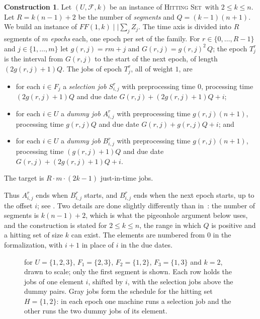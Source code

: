 \documentclass[11pt,a4paper]{article}
\theoremstyle{definition}
\newtheorem{construction}{Construction}
\theoremstyle{plain}
\newcommand{\HS}{\textsc{Hitting Set}}
\begin{document}
\begin{construction}\label{const:hardness}
Let $(U,\mathcal F,k)$ be an instance of \HS\ with $2\le k\le n$. Let $R=k(n-1)+2$ be the number
of \emph{segments} and $Q=(k-1)(n+1)$. We build an instance of $FF(1,k)\mid\mid\sum_jZ_j$. The
time axis is divided into $R$ segments of $m$ \emph{epochs} each, one epoch per set of the
family. For $r\in\{0,\ldots,R-1\}$ and $j\in\{1,\ldots,m\}$ let $g(r,j)=rm+j$ and
$G(r,j)=g(r,j)^2\,Q$; the epoch $T^r_j$ is the interval from $G(r,j)$ to the start of the next
epoch, of length $(2g(r,j)+1)Q$. The jobs of epoch $T^r_j$, all of weight $1$, are
\begin{itemize}
\item for each $i\in F_j$ a \emph{selection job} $S^r_{i,j}$ with preprocessing time $0$,
  processing time $(2g(r,j)+1)Q$ and due date $G(r,j)+(2g(r,j)+1)Q+i$;
\item for each $i\in U$ a \emph{dummy job} $A^r_{i,j}$ with preprocessing time
  $g(r,j)(n+1)$, processing time $g(r,j)Q$ and due date $G(r,j)+g(r,j)Q+i$; and
\item for each $i\in U$ a \emph{dummy job} $B^r_{i,j}$ with preprocessing time
  $g(r,j)(n+1)$, processing time $(g(r,j)+1)Q$ and due date $G(r,j)+(2g(r,j)+1)Q+i$.
\end{itemize}
The target is $R\cdot m\cdot(2k-1)$ just-in-time jobs.
\end{construction}
Thus $A^r_{i,j}$ ends when $B^r_{i,j}$ starts, and $B^r_{i,j}$ ends when the next epoch starts,
up to the offset $i$; see . Two details are done slightly differently than
in~\cite{HHISS26}: the number of segments is $k(n-1)+2$, which is what the pigeonhole argument
below uses, and the construction is stated for $2\le k\le n$, the range in which $Q$ is
positive and a hitting set of size $k$ can exist. The elements are numbered from $0$ in the
formalization, with $i+1$ in place of $i$ in the due dates.

\begin{figure}[tb]
    \centering
    
    \caption{ for $U=\{1,2,3\}$, $F_1=\{2,3\}$, $F_2=\{1,2\}$,
    $F_3=\{1,3\}$ and $k=2$, drawn to scale; only the first segment is shown. Each row holds the
    jobs of one element $i$, shifted by $i$, with the selection jobs above the dummy pairs. Gray
    jobs form the schedule for the hitting set $H=\{1,2\}$: in each epoch one machine runs a
    selection job and the other runs the two dummy jobs of its element.}
    \label{fig:hardness}
\end{figure}
\end{document}
